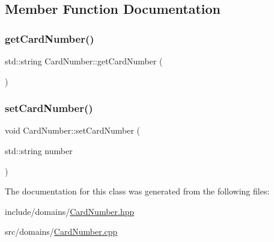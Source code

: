 \subsection{Member Function Documentation}
\mbox{\label{class_card_number_a6f77d7a124e148747e88ac96f8facef7}} 
\subsubsection{\texorpdfstring{getCardNumber()}{getCardNumber()}}
{\footnotesize\ttfamily std\+::string Card\+Number\+::get\+Card\+Number (\begin{DoxyParamCaption}{ }\end{DoxyParamCaption})}

\mbox{\label{class_card_number_ad4c2ff290a231aa91e59cc54f68c19c6}} 
\subsubsection{\texorpdfstring{setCardNumber()}{setCardNumber()}}
{\footnotesize\ttfamily void Card\+Number\+::set\+Card\+Number (\begin{DoxyParamCaption}\item[{std\+::string}]{number }\end{DoxyParamCaption})}



The documentation for this class was generated from the following files\+:\begin{DoxyCompactItemize}
\item 
include/domains/\mbox{\hyperlink{_card_number_8hpp}{Card\+Number.\+hpp}}\item 
src/domains/\mbox{\hyperlink{_card_number_8cpp}{Card\+Number.\+cpp}}\end{DoxyCompactItemize}
